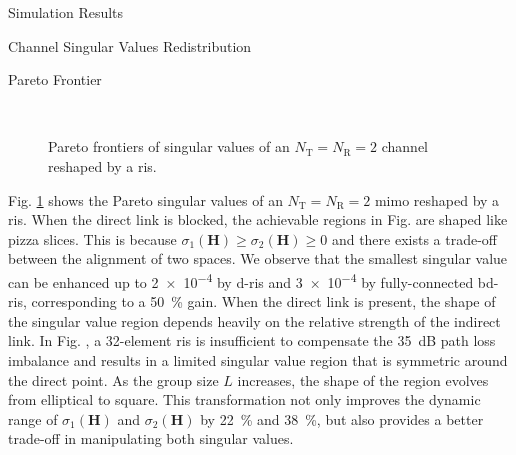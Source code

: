\documentclass[journal]{IEEEtran}
\begin{document}
\begin{section}{Simulation Results}
	\begin{subsection}{Channel Singular Values Redistribution}
		\begin{subsubsection}{Pareto Frontier}
			\begin{figure}[!t]
				\centering
				\\
				\caption{Pareto frontiers of singular values of an $N_\mathrm{T}=N_\mathrm{R}=2$ channel reshaped by a \gls{ris}.}
				\label{fg:singular_pareto}
			\end{figure}
			Fig. \ref{fg:singular_pareto} shows the Pareto singular values of an $N_\mathrm{T}=N_\mathrm{R}=2$ \gls{mimo} reshaped by a \gls{ris}.
			When the direct link is blocked, the achievable regions in Fig.  are shaped like pizza slices.
			This is because $\sigma_1(\mathbf{H}) \ge \sigma_2(\mathbf{H}) \ge 0$ and there exists a trade-off between the alignment of two spaces.
			We observe that the smallest singular value can be enhanced up to \num{2e-4} by \gls{d}-\gls{ris} and \num{3e-4} by fully-connected \gls{bd}-\gls{ris}, corresponding to a \qty{50}{\percent} gain.
			When the direct link is present, the shape of the singular value region depends heavily on the relative strength of the indirect link.
			In Fig. , a 32-element \gls{ris} is insufficient to compensate the \qty{35}{dB} path loss imbalance and results in a limited singular value region that is symmetric around the direct point.
			As the group size $L$ increases, the shape of the region evolves from elliptical to square.
			This transformation not only improves the dynamic range of $\sigma_1(\mathbf{H})$ and $\sigma_2(\mathbf{H})$ by \qty{22}{\percent} and \qty{38}{\percent}, but also provides a better trade-off in manipulating both singular values.

\end{subsubsection}
\end{subsection}
\end{section}
\end{document}
